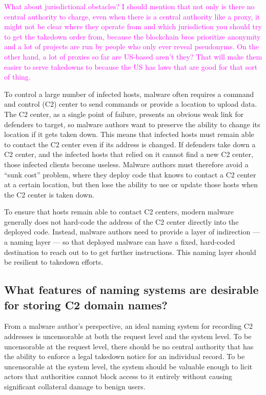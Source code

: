 \documentclass[10pt,sigconf,letterpaper]{acmart}
\newcommand{\randall}{\ding{110}\ding{43}\textcolor{magenta}}
\newcommand{\randall}{}
\begin{document}
\randall{What about jurisdictional obstacles? I should mention that not only is 
there 
no central authority 
to charge, even when there is a central authority like a proxy, it might 
not be clear where they 
operate from and which jurisdiction you should try to get the takedown order 
from, because the 
blockchain bros prioritize anonymity and a lot of projects are run by people 
who only ever reveal 
pseudonyms. On the other hand, a lot of proxies so far are US-based 
aren't they? That will make 
them easier to serve takedowns to because the US has laws that are good for 
that sort of thing.}



To control a large number of infected hosts, malware often requires a command 
and control (C2) 
center 
to send commands or provide a location to upload data. 
The C2 center, as a single point of failure, presents an obvious weak link 
for defenders to target, 
so 
malware authors want to preserve the ability to change its location if it gets 
taken down. This 
means 
that infected hosts must remain able to contact the C2 center even if 
its address is changed. If defenders take down a C2 center, and the 
infected hosts that relied on 
it 
cannot find a new C2 center, those infected clients become useless. Malware 
authors must therefore 
avoid a ``sunk cost'' problem, where they deploy code that knows to contact 
a C2 center at a 
certain 
location, but then lose the ability to use or update those hosts when the C2 
center is taken down.

To ensure that hosts remain able to contact C2 centers, modern malware 
generally does not hard-code 
the address of the C2 center directly into the deployed code. Instead, 
malware authors need to 
provide 
a layer of indirection --- a naming layer --- so that deployed malware can have 
a 
fixed, hard-coded destination to reach out to to get further instructions. 
This naming layer should be resilient to takedown efforts.

\subsection{What features of naming systems are desirable for storing C2 
domain names?}

From a malware author's perspective, an ideal naming system for recording 
C2 
addresses is uncensorable at both the request level and the system level. To be 
uncensorable at the request level, there should be no central authority that 
has the ability to enforce a legal takedown notice for an individual record. To 
be uncensorable at the system level, the system should be valuable enough to 
licit actors that authorities cannot block access to it entirely without 
causing significant collateral damage to benign users.
\end{document}
